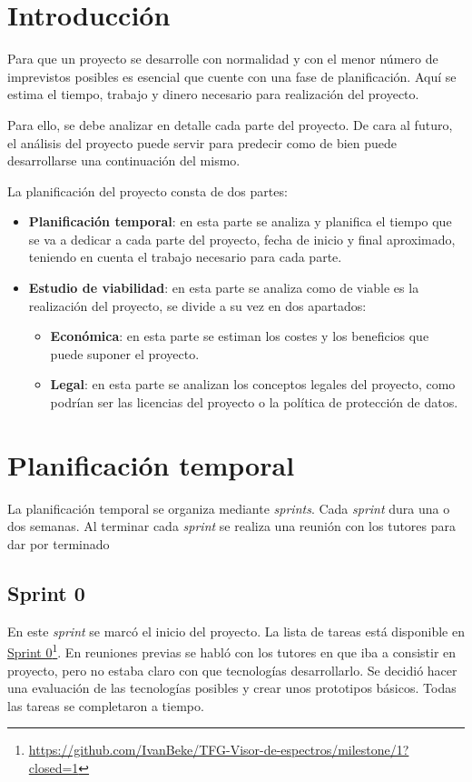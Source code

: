 
\section{Introducción}
Para que un proyecto se desarrolle con normalidad y con el menor número de
imprevistos posibles es esencial que cuente con una fase de planificación. Aquí
se estima el tiempo, trabajo y dinero necesario para realización del proyecto.

Para ello, se debe analizar en detalle cada parte del proyecto. De cara al 
futuro, el análisis del proyecto puede servir para predecir como de bien puede 
desarrollarse una continuación del mismo.

La planificación del proyecto consta de dos partes:
\begin{itemize}
	\tightlist
	\item \textbf{Planificación temporal}: en esta parte se analiza y planifica el
	tiempo que se va a dedicar a cada parte del proyecto, fecha de inicio y final
	aproximado, teniendo en cuenta el trabajo necesario para cada parte.
	\item \textbf{Estudio de viabilidad}: en esta parte se analiza como de viable
	es la realización del proyecto, se divide a su vez en dos apartados:
	
	\begin{itemize}
		\tightlist
		\item \textbf{Económica}: en esta parte se estiman los costes y los beneficios
		que puede suponer el proyecto.
		\item \textbf{Legal}: en esta parte se analizan los conceptos legales del
		proyecto, como podrían ser las licencias del proyecto o la política de
		protección de datos.
	\end{itemize}
\end{itemize}

\section{Planificación temporal}
La planificación temporal se organiza mediante \textit{sprints}. Cada
\textit{sprint} dura una o dos semanas. Al terminar cada \textit{sprint} se
realiza una reunión con los tutores para dar por terminado

\subsection{Sprint 0}
En este \textit{sprint} se marcó el inicio del proyecto. La lista de tareas está
disponible en
\href{https://github.com/IvanBeke/TFG-Visor-de-espectros/milestone/1?closed=1}{Sprint
	0}\footnote{\url{https://github.com/IvanBeke/TFG-Visor-de-espectros/milestone/1?closed=1}}.
En reuniones previas se habló con los tutores en que iba a consistir en
proyecto, pero no estaba claro con que tecnologías desarrollarlo. Se decidió
hacer una evaluación de las tecnologías posibles y crear unos prototipos
básicos. Todas las tareas se completaron a tiempo.\\

